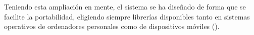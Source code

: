 \begin{itemize}
Teniendo esta ampliación en mente, el sistema se ha diseñado de forma que se facilite la portabilidad, eligiendo siempre librerías disponibles tanto en sistemas operativos de ordenadores personales como de dispositivos móviles ().\\

\end{itemize}

